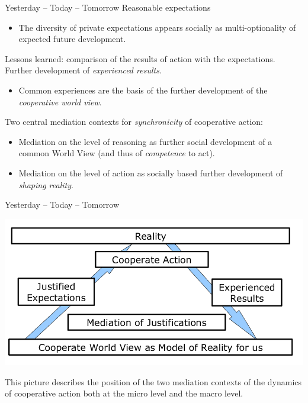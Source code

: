 \documentclass{beamer}
\begin{document}
\begin{frame}{Yesterday -- Today -- Tomorrow}
Reasonable expectations\vspace{-1em}
\begin{itemize}
\item The diversity of private expectations appears socially as
  multi-optionality of expected future development.
\end{itemize}\vspace{-1em}
Lessons learned: comparison of the results of action with the expectations.
Further development of \emph{experienced results}.
\begin{itemize}\vspace{-1em}
\item Common experiences are the basis of the further development of the
  \emph{cooperative world view}.
\end{itemize}\vspace{-1em}
Two central mediation contexts for \emph{synchronicity} of cooperative action:
\begin{itemize}\vspace{-1em}
\item Mediation on the level of reasoning as further social development of a
  common World View (and thus of \emph{competence} to act).
\item Mediation on the level of action as socially based further development
  of \emph{shaping reality}.
\end{itemize}
\end{frame}

\begin{frame}{Yesterday -- Today -- Tomorrow}

  \begin{center}
    \includegraphics[width=.9\textwidth]{KA-1.png}
  \end{center}
  
This picture describes the position of the two mediation contexts of the
dynamics of cooperative action both at the micro level and the macro level.
\end{frame}
\end{document}
